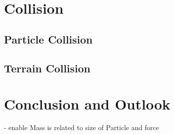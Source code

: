 \documentclass{sig-alternate-05-2015}
\begin{document}
\section{Collision}
\subsection{Particle Collision}
\subsection{Terrain Collision}
\section{Conclusion and Outlook}
- enable Mass is related to size of Particle and force


 
\end{document}
